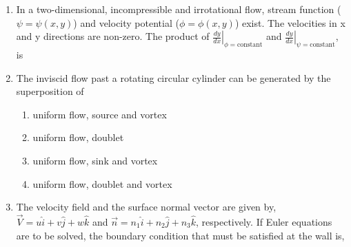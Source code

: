 \documentclass[a4paper,10pt]{article}
\begin{document}
\begin{enumerate}
    \item In a two-dimensional, incompressible and irrotational flow, stream function ($\psi = \psi(x, y)$) and velocity potential ($\phi = \phi(x, y)$) exist. The velocities in x and y directions are non-zero. The product of $\left.\frac{dy}{dx}\right|_{\phi=\text{constant}}$ and $\left.\frac{dy}{dx}\right|_{\psi=\text{constant}}$, is
    \hfill{}
    \begin{enumerate}[label=\Alph*)]
    \end{enumerate}

    \item The inviscid flow past a rotating circular cylinder can be generated by the superposition of
    \hfill{}
    \begin{enumerate}[label=\Alph*)]
        \item uniform flow, source and vortex
        \item uniform flow, doublet
        \item uniform flow, sink and vortex
        \item uniform flow, doublet and vortex
    \end{enumerate}

    \item The velocity field and the surface normal vector are given by, $\vec{V} = u\hat{i} + v\hat{j} + w\hat{k}$ and $\vec{n} = n_1\hat{i} + n_2\hat{j} + n_3\hat{k}$, respectively. If Euler equations are to be solved, the boundary condition that must be satisfied at the wall is,
    \hfill{}
    \begin{enumerate}[label=\Alph*)]
    \end{enumerate}


\end{enumerate}
\end{document}
